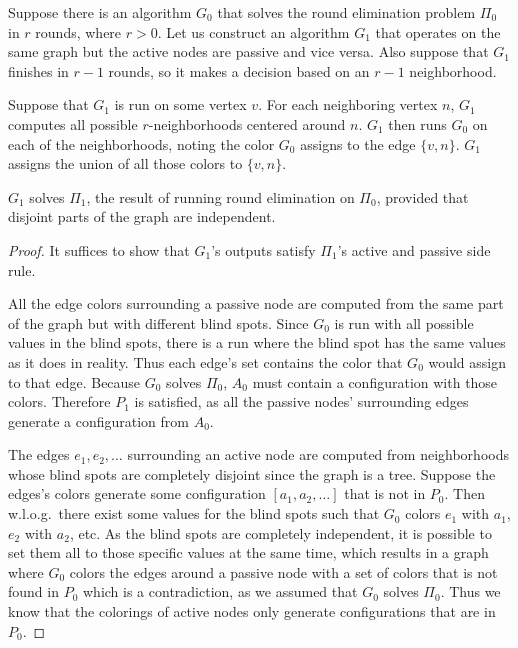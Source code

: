 \documentclass[english, 12pt, a4paper, sci, a-1b, online]{aaltothesis}
\begin{document}
Suppose there is an algorithm $G_0$ that solves the round elimination problem $\Pi_0$ in $r$ rounds, where $r > 0$. Let us construct an algorithm $G_1$ that operates on the same graph but the active nodes are passive and vice versa. Also suppose that $G_1$ finishes in $r-1$ rounds, so it makes a decision based on an $r-1$ neighborhood.

Suppose that $G_1$ is run on some vertex $v$. For each neighboring vertex $n$, $G_1$ computes all possible $r$-neighborhoods centered around $n$. $G_1$ then runs $G_0$ on each of the neighborhoods, noting the color $G_0$ assigns to the edge $\{v, n\}$. $G_1$ assigns the union of all those colors to $\{v, n\}$.

\begin{lemma}
  $G_1$ solves $\Pi_1$, the result of running round elimination on $\Pi_0$, provided that disjoint parts of the graph are independent.
\end{lemma}
\begin{proof}
  It suffices to show that $G_1$'s outputs satisfy $\Pi_1$'s active and passive side rule.

  All the edge colors surrounding a passive node are computed from the same part of the graph but with different blind spots. Since $G_0$ is run  with all possible values in the blind spots, there is a run where the blind spot has the same values as it does in reality. Thus each edge's set contains the color that $G_0$ would assign to that edge. Because $G_0$ solves $\Pi_0$, $A_0$ must contain a configuration with those colors. Therefore $P_1$ is satisfied, as all the passive nodes' surrounding edges generate a configuration from $A_0$.

  The edges $e_1, e_2, \ldots$ surrounding an active node are computed from neighborhoods whose blind spots are completely disjoint since the graph is a tree. Suppose the edges's colors generate some configuration $[a_1, a_2, \ldots]$ that is not in $P_0$. Then w.l.o.g.\ there exist some values for the blind spots such that $G_0$ colors $e_1$ with $a_1$, $e_2$ with $a_2$, etc. As the blind spots are completely independent, it is possible to set them all to those specific values at the same time, which results in a graph where $G_0$ colors the edges around a passive node with a set of colors that is not found in $P_0$ which is a contradiction, as we assumed that $G_0$ solves $\Pi_0$. Thus we know that the colorings of active nodes only generate configurations that are in $P_0$.
\end{proof}
\end{document}
